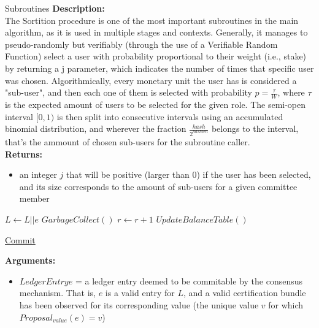 \documentclass[10pt,a4paper]{article}
\begin{document}
\begin{section}{Subroutines}
\noindent \textbf{Description:}\\
The Sortition procedure is one of the most important subroutines in the main algorithm, as it is 
used in multiple stages and contexts.
Generally, it manages to pseudo-randomly but verifiably (through the use of a Verifiable Random 
Function) select a user with probability proportional
to their weight (i.e., stake) by returning a j parameter, which indicates the number of times that 
specific user was chosen.
Algorithmically, every monetary unit the user has is considered a "sub-user", and then each one 
of them is selected with probability $p = \frac{\tau}{W}$,
where $\tau$ is the expected amount of users to be selected for the given role.
The semi-open interval $[0,1)$ is then split into consecutive intervals using an accumulated 
binomial distribution, and wherever the fraction $\frac{hash}{2^{hashlen}}$
belongs to the interval, that's the ammount of chosen sub-users for the subroutine caller.\\

\noindent \textbf{Returns:}
\begin{itemize}
    \item an integer $j$ that will be positive (larger than 0) if the user has been selected, 
    and its size corresponds to the amount of sub-users for a given committee member
  \end{itemize}


\begin{algorithm}[H]
    \begin{algorithmic}[1]

        \State $L \gets L || e$
        \State $GarbageCollect()$
        \State $r \gets r+1$
        \State $UpdateBalanceTable()$

    \EndFunction
    \end{algorithmic}
    \caption{\underline{Commit}}
\end{algorithm}

\noindent \textbf{Arguments:}
\begin{itemize}
    \item $LedgerEntry e$ = a ledger entry deemed to be commitable by the consensus mechanism.
    That is, $e$ is a valid entry for $L$, and a valid certification bundle has been observed for 
    its corresponding value (the unique value $v$ for which $Proposal_{value}(e) = v$)
\end{itemize}


\end{section}
\end{document}
